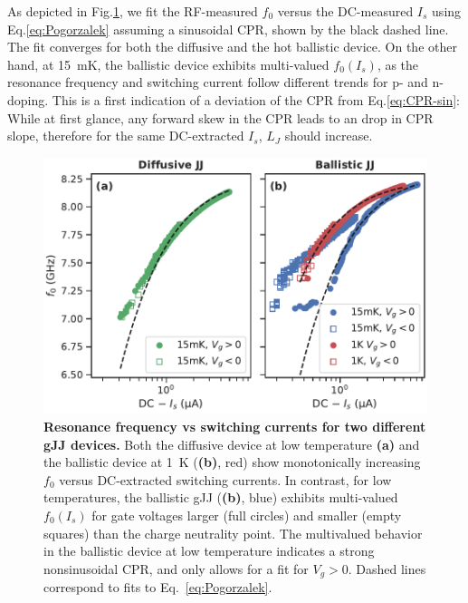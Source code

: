 As depicted in Fig.\ref{fig:figure2}, we fit the RF-measured $f_0$ versus the DC-measured $I_s$ using Eq.\ref{eq:Pogorzalek} assuming a sinusoidal CPR, shown by the black dashed line.
%
The fit converges for both the diffusive and the hot ballistic device.
%
On the other hand, at \SI{15}{\milli\kelvin}, the ballistic device exhibits multi-valued $f_0(I_s)$, as the resonance frequency and switching current follow different trends for p- and n-doping.
%
This is a first indication of a deviation of the CPR from Eq.\ref{eq:CPR-sin}:
%
While at first glance, any forward skew in the CPR leads to an drop in CPR slope, therefore for the same DC-extracted $I_s$, $L_J$ should increase.


\begin{figure}
	\centering
	\includegraphics[width=0.5\linewidth]{chapter-gJJ-CPR/figs/Figure2}
	\caption{
		\textbf{Resonance frequency vs switching currents for two different gJJ devices.}
		Both the diffusive device at low temperature \textbf{(a)} and the ballistic device at \SI{1}{\kelvin} (\textbf{(b)}, red) show monotonically increasing $f_0$ versus DC-extracted switching currents.
		In contrast, for low temperatures, the ballistic gJJ (\textbf{(b)}, blue) exhibits multi-valued $f_0(I_s)$ for gate voltages larger (full circles) and smaller (empty squares) than the charge neutrality point.
		The	multivalued behavior in the ballistic device at low temperature indicates a strong nonsinusoidal CPR, and only allows for a fit for $V_g>0$.
		Dashed lines correspond to fits to Eq.~\ref{eq:Pogorzalek}.
	}
	\label{fig:figure2}
\end{figure}

